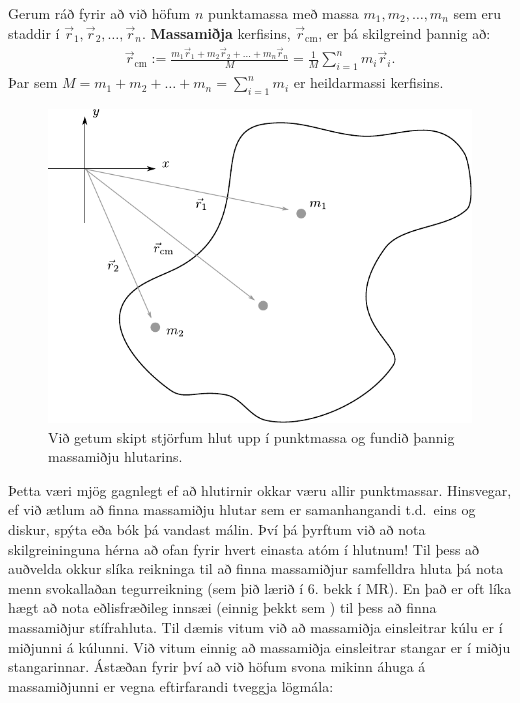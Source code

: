 \ifdefined \wholebook \else\documentclass[oneside]{book}\usepackage{EdlBook}\graphicspath{{figures/}}
\begin{document}
\begin{tcolorbox}
\begin{definition}
Gerum ráð fyrir að við höfum $n$ punktamassa með massa $m_1, m_2, \ldots, m_n$ sem eru staddir í $\Vec{r}_1, \Vec{r}_2, \ldots, \Vec{r}_n$. \textbf{Massamiðja} kerfisins, $\Vec{r}_{\text{cm}}$, er þá skilgreind þannig að:
\begin{align*}
    \Vec{r}_{\text{cm}} := \frac{m_1 \Vec{r}_1 + m_2 \Vec{r}_2 + \ldots + m_n \Vec{r}_n}{M} = \frac{1}{M}\sum_{i=1}^{n} m_i \Vec{r}_i.
\end{align*}
Þar sem $M = m_1 + m_2 + \ldots + m_n = \sum\limits_{i=1}^{n}m_i$ er heildarmassi kerfisins.
\end{definition}
\end{tcolorbox}

\begin{figure}[H]
    \centering
    \includegraphics[scale = 1]{figures/cm1.pdf}
    \caption{Við getum skipt stjörfum hlut upp í punktmassa og fundið þannig massamiðju hlutarins.}
    \label{fig:cm1}
\end{figure}

Þetta væri mjög gagnlegt ef að hlutirnir okkar væru allir punktmassar. Hinsvegar, ef við ætlum að finna massamiðju hlutar sem er samanhangandi t.d.~eins og diskur, spýta eða bók þá vandast málin. Því þá þyrftum við að nota skilgreininguna hérna að ofan fyrir hvert einasta atóm í hlutnum! Til þess að auðvelda okkur slíka reikninga til að finna massamiðjur samfelldra hluta þá nota menn svokallaðan tegurreikning (sem þið lærið í 6. bekk í MR). En það er oft líka hægt að nota eðlisfræðileg innsæi (einnig þekkt sem ) til þess að finna massamiðjur stífrahluta. Til dæmis vitum við að massamiðja einsleitrar kúlu er í miðjunni á kúlunni. Við vitum einnig að massamiðja einsleitrar stangar er í miðju stangarinnar. Ástæðan fyrir því að við höfum svona mikinn áhuga á massamiðjunni er vegna eftirfarandi tveggja lögmála:
\end{document}
